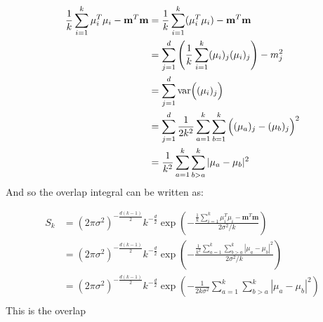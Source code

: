\documentclass[journal=jctcce, manuscript=article]{achemso}
\begin{document}
\begin{align}
\frac{1}{k}\sum_{i=1}^k \mu_i^T \mu_i - \mathbf{m}^T \mathbf{m} &= \frac{1}{k} \sum_{i=1}^k (\mu_i^T \mu_i) - \mathbf{m}^T\mathbf{m} \\
	&= \sum_{j=1}^d \left(\frac{1}{k} \sum_{i=1}^k (\mu_i)_j(\mu_i)_j\right) - m_j^2 \\
	&= \sum_{j=1}^d {\rm var}\Big((\mu_i)_j\Big) \\
	&= \sum_{j=1}^d \frac{1}{2k^2} \sum_{a=1}^k \sum_{b=1}^k \Big((\mu_a)_j - (\mu_b)_j\Big)^2 \\
	&= \frac{1}{k^2} \sum_{a=1}^k \sum_{b>a}^k |\mu_a - \mu_b|^2
\end{align} And so the overlap integral can be written as:

\begin{align}
S_k &= (2\pi \sigma^2)^{- \frac{d (k - 1)}{2}} k^{-\frac{d}{2}} \exp\left(- \frac{\frac{1}{k}\sum_{i=1}^k \mu_i^T\mu_i - \mathbf{m}^T \mathbf{m}}{2 \sigma^2 / k}\right) \\
	&= (2\pi \sigma^2)^{- \frac{d (k - 1)}{2}} k^{-\frac{d}{2}} \exp\left(- \frac{\frac{1}{k^2} \sum_{a=1}^k \sum_{b>a}^k |\mu_a - \mu_b|^2}{2 \sigma^2 / k}\right) \\
	&= (2\pi \sigma^2)^{- \frac{d (k - 1)}{2}} k^{-\frac{d}{2}} \exp\left(- \frac{1}{2 k\sigma^2} \sum_{a=1}^k \sum_{b>a}^k |\mu_a - \mu_b|^2\right) \\
\end{align} This is the overlap
\end{document}
